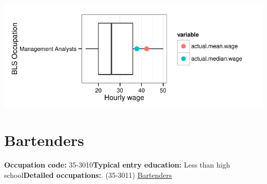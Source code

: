 \documentclass[a4paper,10pt]{article}\usepackage[]{graphicx}\usepackage[]{color}
\makeatletter
\def\maxwidth{ %
  \ifdim\Gin@nat@width>\linewidth
    \linewidth
  \else
    \Gin@nat@width
  \fi
}
\makeatother
\begin{document}
{\centering \includegraphics[width=\maxwidth]{figure/unnamed-chunk-260} 

}


\newpage\section{Bartenders}\textbf{Occupation code:} 35-3010\newline\textbf{Typical entry education:} Less than high school\newline\textbf{Detailed occupations:}. (35-3011)  \href{http://www.bls.gov/oes/current/oes353011.htm}{Bartenders}\newline%
\end{document}
